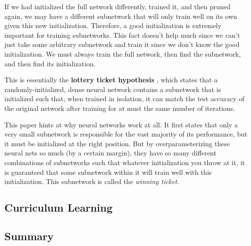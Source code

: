   If we had initialized the full network differently, trained it, and then pruned again, we may have a different subnetwork that will only train well on its own given this new initialization. Therefore, a good initialization is extremely important for training subnetworks. This fact doesn't help much since we can't just take some arbitrary subnetwork and train it since we don't know the good initialization. We must always train the full network, then find the subnetwork, and then find its initialization. 

  This is essentially the \textbf{lottery ticket hypothesis} \cite{frankle2019lottery}, which states that a randomly-initialized, dense neural network contains a subnetwork that is initialized such that, when trained in isolation, it can match the test accuracy of the original network after training for at must the same number of iterations. 

  This paper hints at why neural networks work at all. It first states that only a very small subnetwork is responsible for the vast majority of its performance, but it must be initialized at the right position. But by overparameterizing these neural nets so much (by a certain margin), they have so many different combinations of subnetworks such that whatever initialization you throw at it, it is guaranteed that some subnetwork within it will train well with this initialization. This subnetwork is called the \textit{winning ticket}. 

\subsection{Curriculum Learning}

\subsection{Summary}

